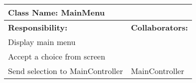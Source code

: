 \documentclass[english]{article}
\begin{document}
    \begin{table}[!ht]
        \centering
        \begin{tabular}{|p{8cm}|p{4cm}|}
        \hline 
        \multicolumn{2}{|l|}{\textbf{Class Name: MainMenu}} \\
        \hline
        \textbf{Responsibility:} & \textbf{Collaborators:} \\
        \hline
        Display main menu & \\
        \hline
        Accept a choice from screen & \\
        \hline
        Send selection to MainController & MainController \\
        \hline
        \end{tabular}
    \end{table}
    
\end{document}
